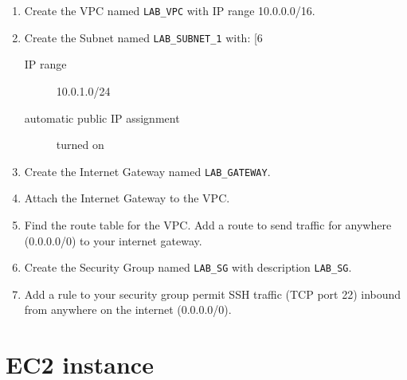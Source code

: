 \begin{enumerate}

\item 
  Create the VPC named \texttt{LAB\_VPC} with IP range 10.0.0.0/16.

\item
  Create the Subnet named \texttt{LAB\_SUBNET\_1} with:
[6~  \begin{description}
  \item[IP range] 10.0.1.0/24
  \item[automatic public IP assignment] turned on
  \end{description}
  
\item
  Create the Internet Gateway named \texttt{LAB\_GATEWAY}.

\item
  Attach the Internet Gateway to the VPC.

\item
  Find the route table for the VPC.
  Add a route to send traffic for anywhere (0.0.0.0/0) to your internet gateway.

\item
  Create the Security Group named \texttt{LAB\_SG} with description \texttt{LAB\_SG}.

\item 
  Add a rule to your security group permit SSH traffic (TCP port 22) inbound from anywhere on the internet (0.0.0.0/0).
  
\end{enumerate}

\section{EC2 instance}

